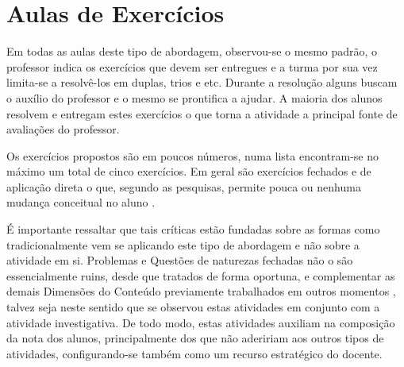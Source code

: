  \section{Aulas de Exercícios}
 Em todas as aulas deste tipo de abordagem, observou-se o mesmo padrão, o professor indica os exercícios que devem ser entregues e a turma por sua vez limita-se a resolvê-los em duplas, trios e etc. Durante a resolução alguns buscam o auxílio do professor e o mesmo se prontifica a ajudar. A maioria dos alunos resolvem e entregam estes exercícios o que torna a atividade a principal fonte de avaliações do professor.

 Os exercícios propostos são em poucos números, numa lista encontram-se no máximo um total de cinco exercícios. Em geral são exercícios fechados e de aplicação direta o que, segundo as pesquisas, permite pouca ou nenhuma mudança conceitual no aluno \cite{CLEMENT:2012,PEREZ1992,Carvalho1999}.

 É importante ressaltar que tais críticas estão fundadas sobre as formas como tradicionalmente vem se aplicando este tipo de abordagem e não sobre a atividade em si. Problemas e Questões de naturezas fechadas não o são essencialmente ruins, desde que tratados de forma oportuna, e complementar as demais Dimensões do Conteúdo previamente trabalhados em outros momentos \cite{PEREZ1992}, talvez seja neste sentido que se observou estas atividades em conjunto com a atividade investigativa. De todo modo, estas atividades auxiliam na composição da nota dos alunos, principalmente dos que não adeririam aos outros tipos de atividades, configurando-se também como um recurso estratégico do docente.